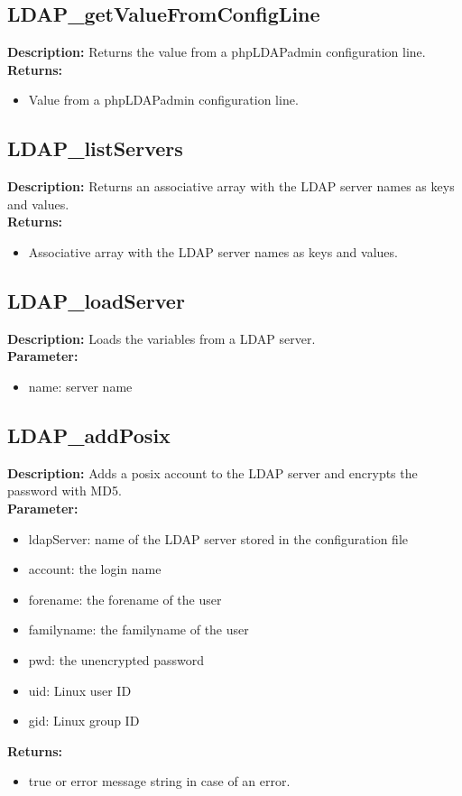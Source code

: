 \subsection{LDAP\_getValueFromConfigLine}
\textbf{Description:} Returns the value from a phpLDAPadmin configuration line.\\
\textbf{Returns:}
\begin{itemize}
\item Value from a phpLDAPadmin configuration line.
\end{itemize}

\subsection{LDAP\_listServers}
\textbf{Description:} Returns an associative array with the LDAP server names as keys and values.\\
\textbf{Returns:}
\begin{itemize}
\item Associative array with the LDAP server names as keys and values.
\end{itemize}

\subsection{LDAP\_loadServer}
\textbf{Description:} Loads the variables from a LDAP server.\\
\textbf{Parameter:}
\begin{itemize}
\item name: server name
\end{itemize}

\subsection{LDAP\_addPosix}
\textbf{Description:} Adds a posix account to the LDAP server and encrypts the password with MD5.\\
\textbf{Parameter:}
\begin{itemize}
\item ldapServer: name of the LDAP server stored in the configuration file
\item account: the login name
\item forename: the forename of the user
\item familyname: the familyname of the user
\item pwd: the unencrypted password
\item uid: Linux user ID
\item gid: Linux group ID
\end{itemize}
\textbf{Returns:}
\begin{itemize}
\item true or error message string in case of an error.
\end{itemize}

